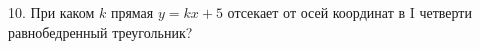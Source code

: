 10. При каком $k$ прямая $y=kx+5$ отсекает от осей координат в I четверти равнобедренный треугольник?\\
